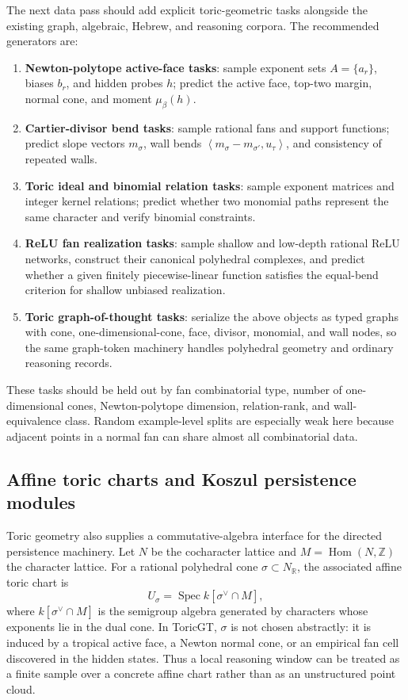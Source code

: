 \documentclass[11pt]{article}
\theoremstyle{definition}
\theoremstyle{plain}
\theoremstyle{remark}
\numberwithin{equation}{section}
\newcommand{\R}{\mathbb{R}}
\newcommand{\Z}{\mathbb{Z}}
\newcommand{\ip}[2]{\left\langle #1,#2\right\rangle}
\begin{document}
The next data pass should add explicit toric-geometric tasks alongside the existing graph, algebraic, Hebrew, and reasoning corpora.  The recommended generators are:
\begin{enumerate}[leftmargin=2em]
  \item \textbf{Newton-polytope active-face tasks}: sample exponent sets $A=\{a_r\}$, biases $b_r$, and hidden probes $h$; predict the active face, top-two margin, normal cone, and moment $\mu_\beta(h)$.
  \item \textbf{Cartier-divisor bend tasks}: sample rational fans and support functions; predict slope vectors $m_\sigma$, wall bends $\ip{m_\sigma-m_{\sigma'}}{u_\tau}$, and consistency of repeated walls.
  \item \textbf{Toric ideal and binomial relation tasks}: sample exponent matrices and integer kernel relations; predict whether two monomial paths represent the same character and verify binomial constraints.
  \item \textbf{ReLU fan realization tasks}: sample shallow and low-depth rational ReLU networks, construct their canonical polyhedral complexes, and predict whether a given finitely piecewise-linear function satisfies the equal-bend criterion for shallow unbiased realization.
  \item \textbf{Toric graph-of-thought tasks}: serialize the above objects as typed graphs with cone, one-dimensional-cone, face, divisor, monomial, and wall nodes, so the same graph-token machinery handles polyhedral geometry and ordinary reasoning records.
\end{enumerate}
These tasks should be held out by fan combinatorial type, number of one-dimensional cones, Newton-polytope dimension, relation-rank, and wall-equivalence class.  Random example-level splits are especially weak here because adjacent points in a normal fan can share almost all combinatorial data.

\subsection{Affine toric charts and Koszul persistence modules}

Toric geometry also supplies a commutative-algebra interface for the directed persistence machinery.  Let $N$ be the cocharacter lattice and $M=\operatorname{Hom}(N,\Z)$ the character lattice.  For a rational polyhedral cone $\sigma\subset N_\R$, the associated affine toric chart is
\begin{equation}
  U_\sigma=\operatorname{Spec} k[\sigma^\vee\cap M],
\end{equation}
where $k[\sigma^\vee\cap M]$ is the semigroup algebra generated by characters whose exponents lie in the dual cone.  In ToricGT, $\sigma$ is not chosen abstractly: it is induced by a tropical active face, a Newton normal cone, or an empirical fan cell discovered in the hidden states.  Thus a local reasoning window can be treated as a finite sample over a concrete affine chart rather than as an unstructured point cloud.
\end{document}
